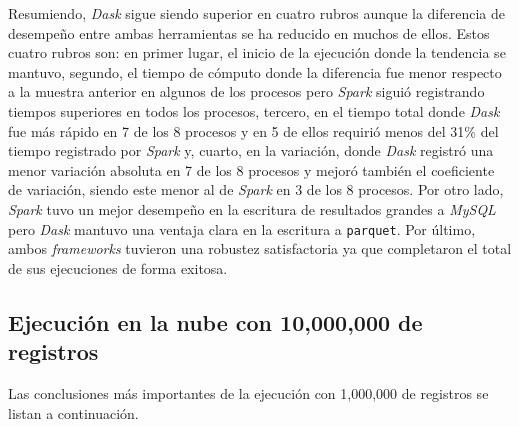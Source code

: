 Resumiendo, \textit{Dask} sigue siendo superior en cuatro rubros aunque la diferencia de desempeño entre ambas herramientas se ha reducido en muchos de ellos. Estos cuatro rubros son: en primer lugar, el inicio de la ejecución donde la tendencia se mantuvo, segundo, el tiempo de cómputo donde la diferencia fue menor respecto a la muestra anterior en algunos de los procesos pero \textit{Spark} siguió registrando tiempos superiores en todos los procesos, tercero, en el tiempo total donde \textit{Dask} fue más rápido en 7 de los 8 procesos y en 5 de ellos requirió menos del 31\% del tiempo registrado por \textit{Spark} y, cuarto, en la variación, donde \textit{Dask} registró una menor variación absoluta en 7 de los 8 procesos y mejoró también el coeficiente de variación, siendo este menor al de \textit{Spark} en 3 de los 8 procesos. Por otro lado, \textit{Spark} tuvo un mejor desempeño en la escritura de resultados grandes a \textit{MySQL} pero \textit{Dask} mantuvo una ventaja clara en la escritura a \texttt{parquet}. Por último, ambos \textit{frameworks} tuvieron una robustez satisfactoria ya que completaron el total de sus ejecuciones de forma exitosa.


\subsection{Ejecución en la nube con 10,000,000 de registros}

Las conclusiones más importantes de la ejecución con 1,000,000 de registros se listan a continuación.

